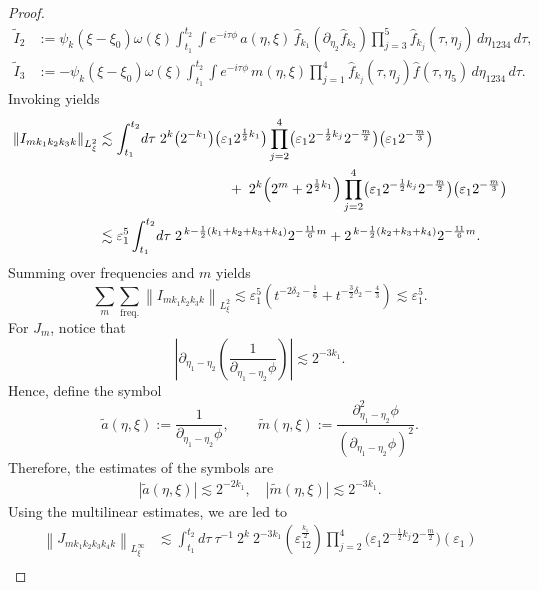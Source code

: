 \documentclass[reqno,english,11pt]{amsart}
\newcommand{\eps}{\varepsilon}
\newcommand{\snorm}[1]{\left\|#1\right\|}
\theoremstyle{definition}
\numberwithin{equation}{section}
\begin{document}
\begin{proof}
\begin{align*}
\tilde I_2
&:=\psi_k(\xi-\xi_0)\omega(\xi)
\int_{t_1}^{t_2}\!\!\int
e^{-i\tau\phi}\,
a(\eta,\xi)\,
\hat f_{k_1}(\partial_{\eta_2}\hat f_{k_2})\prod^5_{j=3}\hat f_{k_j}(\tau,\eta_j)
\,d\eta_{1234}\,d\tau,\\
\tilde I_3
&:=
-\psi_k(\xi-\xi_0)\omega(\xi)
\int_{t_1}^{t_2}\!\!\int
e^{-i\tau\phi}\,m(\eta,\xi) \prod_{j=1}^4 \hat f_{k_j}(\tau,\eta_j)\hat f(\tau,\eta_5)
\,d\eta_{1234}\,d\tau.
\end{align*}
Invoking \cite[Proposition B.1]{Morgan} yields
\begin{align*}
\snorm{I_{m k_1 k_2 k_3 k}}_{L^2_\xi}
&\lesssim \int_{t_1}^{t_2} \! d\tau \;2^k \bigl(2^{-k_1}\bigr)\bigl(\eps_1 2^{\frac{1}{2}k_1}\bigr)\prod^4_{j=2}\bigl(\eps_1 2^{-\frac{1}{2}k_j} 2^{-\frac{m}{2}}\bigr)\bigl(\eps_1 2^{-\frac{m}{3}}\bigr) \\
&\quad \quad \quad  \quad \quad \quad \quad \quad \quad \;+ \; 2^k \Bigl(2^{m} + 2^{\frac{1}{2}k_1}\Bigr)\prod^4_{j=2} \bigl(\eps_1 2^{-\frac{1}{2}k_j} 2^{-\frac{m}{2}}\bigr)\bigl(\eps_1 2^{-\frac{m}{3}}\bigr) \\
&\lesssim \eps_1^5 \int_{t_1}^{t_2} \! d\tau \;
2^{\,k - \frac{1}{2}(k_1+k_2+k_3+k_4)} 2^{-\frac{11}{6}m}
+ 2^{\,k - \frac{1}{2}(k_2+k_3+k_4)} 2^{-\frac{11}{6}m}.
\end{align*}
Summing over frequencies and $m$ yields
$$\sum_{m}\sum_{\operatorname{freq.}}\snorm{I_{m k_1 k_2 k_3 k}}_{L^2_\xi}\lesssim \eps_1^5\left(t^
{-2\delta_2-\frac{1}{6}}+t^{-\frac{3}{2}\delta_2-\frac{4}{3}}\right)\lesssim \eps_1^5.$$
For $J_m$, notice that
$$\left|\partial_{\eta_1-\eta_2}\left(\frac{1}{\partial_{\eta_1-\eta_2}\phi}\right)\right|\lesssim 2^{-3k_1}.$$
Hence, define the symbol
\begin{equation}\label{eq:def_a_tilde_symbol_deg_case_3}
\tilde{a}(\eta,\xi):=\frac{1}{ \partial_{\eta_1-\eta_2}\phi},\qquad 
\tilde{m}(\eta,\xi):=\frac{\partial^2_{\eta_1-\eta_2}\phi}{ (\partial_{\eta_1-\eta_2}\phi)^2} .
\end{equation}
Therefore, the estimates of the symbols are
    \begin{align}\label{eqn:a_m_tilde_bound}
     \left|\tilde{a}(\eta,\xi) \right| \lesssim 2^{-2k_{1}}, \quad \left|\tilde{m}(\eta,\xi)\right| \lesssim 2^{-3k_{1}}. 
    \end{align}
Using the multilinear estimates, we are led to
\begin{align*}
    \snorm{J_{mk_1k_2k_3k_4k}}_{L_\xi^\infty}&\lesssim \int^{t_2}_{t_1} d \tau \ \tau^{-1}\ 2^k\   2^{-3k_1}\left(\eps_12^{\frac{k_1}{2}}\right)\prod^4_{j=2} \bigl(\eps_1 2^{-\frac{1}{2}k_j}2^{-\frac{m}{2}}\bigr)\left(\eps_1\right)\\

\end{align*}
\end{proof}
\end{document}

